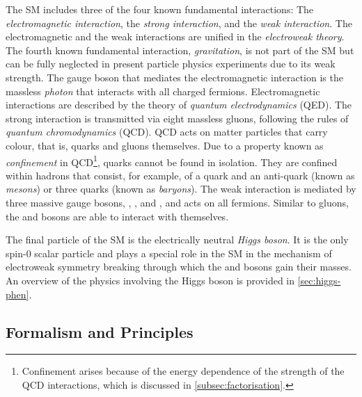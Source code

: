 The SM includes three of the four known fundamental interactions: The \emph{electromagnetic interaction}, the \emph{strong interaction}, and the \emph{weak interaction}. The electromagnetic and the weak interactions are unified in the \emph{electroweak theory}. The fourth known fundamental interaction, \emph{gravitation}, is not part of the SM but can be fully neglected in present particle physics experiments due to its weak strength.
The gauge boson that mediates the electromagnetic interaction is the massless \emph{photon} that interacts with all charged fermions. Electromagnetic interactions are described by the theory of \emph{quantum electrodynamics} (QED). The strong interaction is transmitted via eight massless gluons, following the rules of \emph{quantum chromodynamics} (QCD). QCD acts on matter particles that carry colour, that is, quarks and gluons themselves. 
Due to a property known as \emph{confinement} in QCD\footnote{Confinement arises because of the energy dependence of the strength of the QCD interactions, which is discussed in \cref{subsec:factorisation}.}, quarks cannot be found in isolation. They are confined within hadrons that consist, for example, of a quark and an anti-quark (known as \emph{mesons}) or three quarks (known as \emph{baryons}).
The weak interaction is mediated by three massive gauge bosons, \Wplus, \Wminus, and \Zboson, and acts on all fermions. Similar to gluons, the \Wpm and \Zboson bosons are able to interact with themselves.

The final particle of the SM is the electrically neutral \emph{Higgs boson}. It is the only spin-0 scalar particle and plays a special role in the SM in the mechanism of electroweak symmetry breaking through which the \Wpm and \Zboson bosons gain their masses. An overview of the physics involving the Higgs boson is provided in \cref{sec:higgs-phen}.


\subsection{Formalism and Principles}
\label{subsec:formalism}


